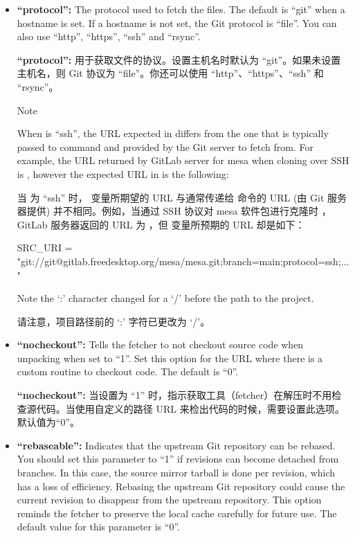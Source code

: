\begin{itemize}
\setlength\itemsep{1.0em}
\item \textbf{``protocol'':} The protocol used to fetch the files. The default is ``git'' when a hostname is set. If a hostname is not set, the Git protocol is ``file''. You can also use ``http'', ``https'', ``ssh'' and ``rsync''.

\medskip
\textbf{``protocol'':} 用于获取文件的协议。设置主机名时默认为 ``git''。如果未设置主机名，则 Git 协议为 ``file''。你还可以使用 ``http''、``https''、``ssh'' 和 ``rsync''。

\medskip
\begin{noteblock}{Note}%

When  is ``ssh'', the URL expected in  differs from the one that is typically passed to  command and provided by the Git server to fetch from. For example, the URL returned by GitLab server for mesa when cloning over SSH is , however the expected URL in  is the following:

\medskip
当  为 ``ssh'' 时，  变量所期望的 URL 与通常传递给  命令的 URL (由 Git 服务器提供) 并不相同。例如，当通过 SSH 协议对 mesa 软件包进行克隆时 ，GitLab 服务器返回的 URL 为 ，但  变量所预期的 URL 却是如下：

\medskip
\begin{pyglist}
SRC_URI = "git://git@gitlab.freedesktop.org/mesa/mesa.git;branch=main;protocol=ssh;..."
\end{pyglist}

\medskip
Note the `:' character changed for a `/' before the path to the project.

\medskip
请注意，项目路径前的 `:' 字符已更改为 `/'。
\end{noteblock}

\item \textbf{``nocheckout'':} Tells the fetcher to not checkout source code when unpacking when set to ``1''. Set this option for the URL where there is a custom routine to checkout code. The default is ``0''.

\medskip
\textbf{``nocheckout'':} 当设置为 ``1'' 时，指示获取工具（fetcher）在解压时不用检查源代码。当使用自定义的路径 URL 来检出代码的时候，需要设置此选项。默认值为“0”。

\item \textbf{``rebaseable'':} Indicates that the upstream Git repository can be rebased\footnotemark[1]. You should set this parameter to ``1'' if revisions can become detached from branches. In this case, the source mirror tarball is done per revision, which has a loss of efficiency. Rebasing the upstream Git repository could cause the current revision to disappear from the upstream repository. This option reminds the fetcher to preserve the local cache carefully for future use. The default value for this parameter is ``0''.


\end{itemize}
